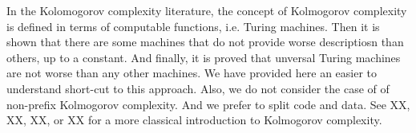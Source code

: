In the Kolomogorov complexity literature, the concept of Kolmogorov complexity is defined in terms of computable functions, i.e. Turing machines. Then it is shown that there are some machines that do not provide worse descriptiosn than others, up to a constant. And finally, it is proved that unversal Turing machines are not worse than any other machines. We have provided here an easier to understand short-cut to this approach. Also, we do not consider the case of of non-prefix Kolmogorov complexity. And we prefer to split code and data. See XX, XX, XX, or XX for a more classical introduction to Kolmogorov complexity.

